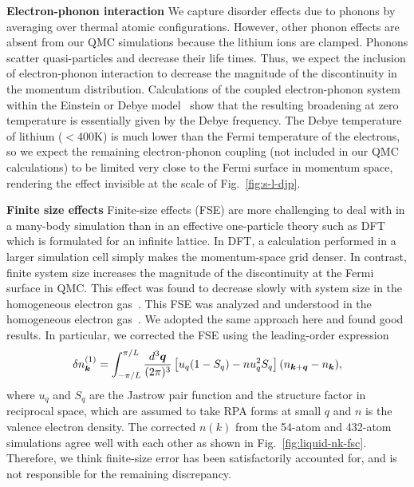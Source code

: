 {\bf Electron-phonon interaction} We capture disorder effects due to phonons by averaging over thermal atomic configurations. However, other phonon effects are absent from our QMC simulations because the lithium ions are clamped. Phonons scatter quasi-particles and decrease their life times. Thus, we expect the inclusion of electron-phonon interaction to decrease the magnitude of the discontinuity in the momentum distribution. Calculations of the coupled electron-phonon system within the Einstein or Debye model~\cite{PhysRev.131.993} show that the resulting broadening
at zero temperature is essentially given by the Debye frequency.
The Debye temperature of lithium ($<$400K) is much lower than the Fermi temperature of the electrons, so we expect the remaining electron-phonon coupling (not included
in our QMC calculations) to be limited very close to the Fermi surface in momentum space, rendering the effect invisible at the scale of Fig.~\ref{fig:s-l-djp}.

{\bf Finite size effects}  Finite-size effects (FSE) are more challenging to deal with in a many-body simulation than in an effective one-particle theory such as DFT which is formulated for an infinite lattice. In DFT, a calculation performed in a larger simulation cell simply makes the momentum-space grid denser. In contrast, finite system size increases the magnitude of the discontinuity at the Fermi surface in QMC. This effect was found to decrease slowly with system size in the homogeneous electron gas~\cite{Holzmann2009}. This FSE  was analyzed and understood in the homogeneous electron gas~\cite{Holzmann2009,Holzmann2011}. We adopted the same approach here and found good results. In particular, we corrected the FSE using the leading-order expression
\begin{equation} \label{eq:nk-fsc}
\delta n_{\boldsymbol{k}}^{(1)} = \int_{-\pi/L}^{\pi/L} \frac{d^3\boldsymbol{q}}{(2\pi)^3} \left[
u_q (1-S_q) - nu_q^2 S_q
\right] (n_{\boldsymbol{k}+\boldsymbol{q}}-n_{\boldsymbol{k}}),
\end{equation}
where $u_q$ and $S_q$ are the Jastrow pair function and the structure factor in reciprocal space, which are assumed to take RPA forms at small $q$ and $n$ is the valence electron density. The corrected $n(k)$ from the 54-atom and 432-atom simulations agree well with each other as shown in Fig.~\ref{fig:liquid-nk-fsc}. Therefore, we think finite-size error has been satisfactorily accounted for, and is not responsible for the remaining discrepancy.

